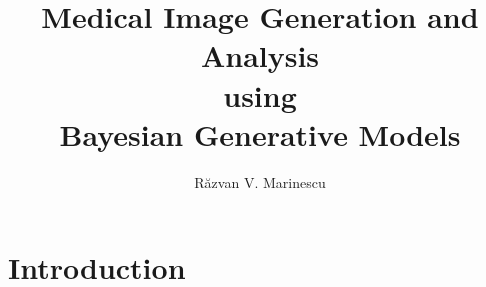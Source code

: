 \documentclass[8pt,xcolor=table,aspectratio=169]{beamer}
\title{Medical Image Generation and Analysis\\ using\\ Bayesian Generative Models}
\author[Raz]{
R\u{a}zvan V. Marinescu\vspace{1em}}
\institute{\small{Massachusetts Institute of Technology}

}
\date{}
\newcommand{\xmark}{\ding{55}}%
\begin{document}
 
\section{Introduction}

 

\newcommand{\upgradeReportLoc}{../../upgrade_report}
\newcommand{\epsrcPresLoc}{\upgradeReportLoc/epsrcPres}
\newcommand{\jointModellingDiseaseLoc}{../../jointModellingDisease}
\newcommand{\pcaLongPaperLoc}{../../PCA_long_paper}
\newcommand{\voxFld}{../../voxelwiseDPM}
\newcommand{\tadpoleFld}{../../tadpole}
\newcommand{\diffEqModelFld}{../../diffEqModel}

\newcommand{\outFolder}{../overview/modelDiagram}
\newcommand{\lw}{0.5mm}

\newcommand{\yes}{{\LARGE \textcolor{green!50!black}{\checkmark} \par}}
\newcommand{\no}{{\LARGE \textcolor{red}{\xmark} \par}}





\newcommand{\inc}[1]{\texttt{[image: \#1]}}
\newcommand{\incw}[2]{\texttt{[image: \#1]}}
\newcommand{\inch}[2]{\texttt{[image: \#1]}}

\newcommand{\vo}{\vspace{1em}}
\newcommand{\vt}{\vspace{2em}}
\newcommand{\vth}{\vspace{3em}}
\end{document}
